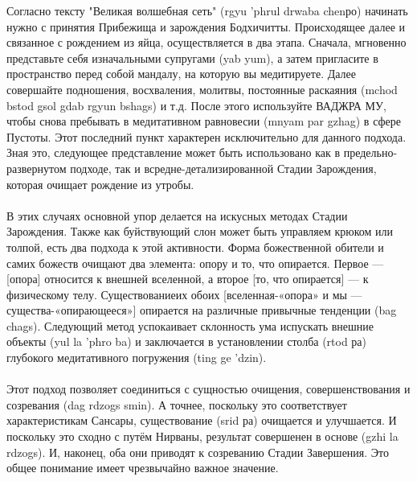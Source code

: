 Согласно тексту "Великая волшебная сеть" (rgyu 'phrul drwaba chenро) начинать
нужно с принятия Прибежища и зарождения Бодхичитты. Происходящее далее и связанное
с рождением из яйца, осуществляется в два этапа. Сначала, мгновенно представьте себя
изначальными супругами (yab yum), а затем пригласите в пространство перед собой мандалу,
на которую вы медитируете. Далее совершайте подношения, восхваления, молитвы,
постоянные раскаяния (mchod bstod gsol gdab rgyun bshags) и т.д. После этого используйте
ВАДЖРА МУ, чтобы снова пребывать в медитативном равновесии (mnyam par gzhag) в
сфере Пустоты. Этот последний пункт характерен исключительно для данного подхода.
Зная это, следующее представление может быть использовано как в предельно-развернутом
подходе, так и всредне-детализированной Стадии Зарождения, которая очищает рождение
из утробы.\\
\\
В этих случаях основной упор делается на искусных методах Стадии Зарождения.
Также как буйствующий слон может быть управляем крюком или толпой, есть два подхода к этой
активности. Форма божественной обители и самих божеств очищают два элемента: опору и
то, что опирается. Первое — [опора] относится к внешней вселенной, а второе 
[то, что опирается] — к физическому телу. Существованиеих обоих 
[вселенная-«опора» и мы — существа-«опирающееся»] опирается на различные
привычные тенденции (bag chags). Следующий метод успокаивает склонность ума
испускать внешние объекты (yul la 'phro ba) и заключается в установлении
столба (rtod ра) глубокого медитативного погружения (ting ge 'dzin).\\
\\
Этот подход позволяет соединиться с сущностью очищения, совершенствования и
созревания (dag rdzogs smin). А точнее, поскольку это соответствует характеристикам
Сансары, существование (srid ра) очищается и улучшается. И поскольку это сходно с путём
Нирваны, результат совершенен в основе (gzhi la rdzogs). И, наконец, оба они приводят к
созреванию Стадии Завершения. Это общее понимание имеет чрезвычайно важное значение.\\
\\
